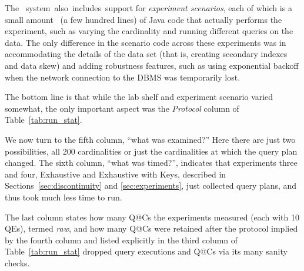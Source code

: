 \documentclass[prodmode,acmtods]{acmsmall}
\def\azdb{\doubleblind{\hbox{\sc AZDBLab}}{\hbox{\sc DBLab}}}
\begin{document}
The \hbox{\azdb\ system also includes support} for {\em experiment
  scenarios}, each of which
is a small amount~ (a few hundred lines) of Java code that actually performs the experiment, such as varying the
cardinality and running different queries on the data. The only difference
in the scenario code across these experiments was in accommodating the
details of the data set (that is, creating secondary indexes and data skew)
and adding robustness features, such as using exponential backoff when the
network connection to the DBMS was temporarily lost.

The bottom line is that while the lab shelf and experiment scenario varied
somewhat, the only important aspect was the {\em Protocol} column of
Table~\ref{tab:run_stat}.

We now turn to the fifth column, ``what was examined?'' Here there are just two
possibilities, all 200 cardinalities or just the cardinalities at which the
query plan changed. The sixth column, ``what was timed?'', indicates that experiments three and four, Exhaustive and
Exhaustive with Keys, described in Sections~\ref{sec:discontinuity} and \ref{sec:experiments}, just
collected query plans, and thus took much less time to run.

The last column states how many Q@Cs the experiments measured (each with 10
QEs), termed {\em raw}, and how many Q@Cs were retained after the protocol
implied by the fourth column and listed explicitly in the third column of
Table~\ref{tab:run_stat} dropped query executions and Q@Cs via its many
  sanity checks.
\end{document}
